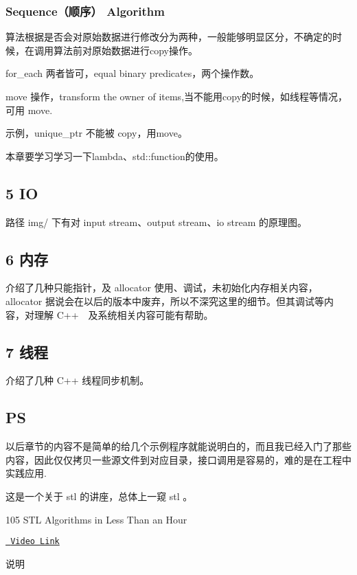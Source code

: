 \subsubsection*{Sequence（顺序） Algorithm}

算法根据是否会对原始数据进行修改分为两种，一般能够明显区分，不确定的时候，在调用算法前对原始数据进行copy操作。

for\+\_\+each 两者皆可，equal binary predicates，两个操作数。

move 操作，transform the owner of items,当不能用copy的时候，如线程等情况，可用 move.

示例，unique\+\_\+ptr 不能被 copy，用move。

本章要学习学习一下lambda、std\+::function的使用。

\subsection*{5 IO}

路径 img/ 下有对 input stream、output stream、io stream 的原理图。

\subsection*{6 内存}

介绍了几种只能指针，及 allocator 使用、调试，未初始化内存相关内容，allocator 据说会在以后的版本中废弃，所以不深究这里的细节。但其调试等内容，对理解 C++　及系统相关内容可能有帮助。

\subsection*{7 线程}

介绍了几种 C++ 线程同步机制。 \subsection*{PS}

以后章节的内容不是简单的给几个示例程序就能说明白的，而且我已经入门了那些内容，因此仅仅拷贝一些源文件到对应目录，接口调用是容易的，难的是在工程中实践应用.

这是一个关于 stl 的讲座，总体上一窥 stl 。

105 S\+TL Algorithms in Less Than an Hour

\href{https://www.bilibili.com/video/av46316166?from=search&seid=16850541774524193645}{\texttt{ Video Link}}

说明

